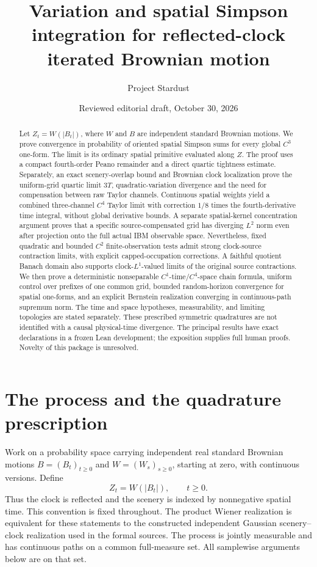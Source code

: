 \documentclass[11pt]{article}
\title{Variation and spatial Simpson integration for reflected-clock\protect\\
iterated Brownian motion}
\author{Project Stardust}
\date{Reviewed editorial draft, October 30, 2026}
\theoremstyle{remark}\newtheorem{remark}[theorem]{Remark}
\begin{document}
\maketitle
\begin{abstract}
Let $Z_t=W(|B_t|)$, where $W$ and $B$ are independent standard
Brownian motions. We prove convergence in probability of oriented
spatial Simpson sums for every global $C^3$ one-form. The limit
is its ordinary spatial primitive evaluated along $Z$. The proof
uses a compact fourth-order Peano remainder and a direct quartic
tightness estimate. Separately, an exact scenery-overlap bound and
Brownian clock localization prove the uniform-grid quartic limit
$3T$, quadratic-variation divergence and the need for compensation
between raw Taylor channels. Continuous spatial weights yield a combined
three-channel $C^4$ Taylor limit with correction $1/8$ times the
fourth-derivative time integral, without global derivative bounds.
A separate spatial-kernel concentration argument proves that a specific source-compensated grid has diverging $L^2$ norm even after projection onto the full actual IBM observable space.
Nevertheless, fixed quadratic and bounded $C^2$ finite-observation tests admit strong clock-source contraction limits, with explicit capped-occupation corrections. A faithful quotient Banach domain also supports clock-$L^1$-valued limits of the original source contractions.
We then prove a deterministic nonseparable $C^1$-time/$C^4$-space
chain formula, uniform control over prefixes of one common grid,
bounded random-horizon convergence for spatial one-forms, and an
explicit Bernstein realization converging in continuous-path
supremum norm. The time and space hypotheses, measurability, and
limiting topologies are stated separately. These prescribed
symmetric quadratures are not identified with a causal physical-time
divergence. The principal results have exact declarations in a
frozen Lean development; the exposition supplies full human proofs.
Novelty of this package is unresolved.
\end{abstract}

\section{The process and the quadrature prescription}
Work on a probability space carrying independent real standard
Brownian motions $B=(B_t)_{t\geq0}$ and $W=(W_s)_{s\geq0}$,
starting at zero, with continuous versions. Define
\begin{equation}\label{eq:ibm}
 Z_t=W(|B_t|),\qquad t\geq0.
\end{equation}
Thus the clock is reflected and the scenery is indexed by
nonnegative spatial time. This convention is fixed throughout.
The product Wiener realization is equivalent for these statements
to the constructed independent Gaussian scenery--clock realization
used in the formal sources. The process is jointly measurable and
has continuous paths on a common full-measure set. All samplewise
arguments below are on that set.
\end{document}
